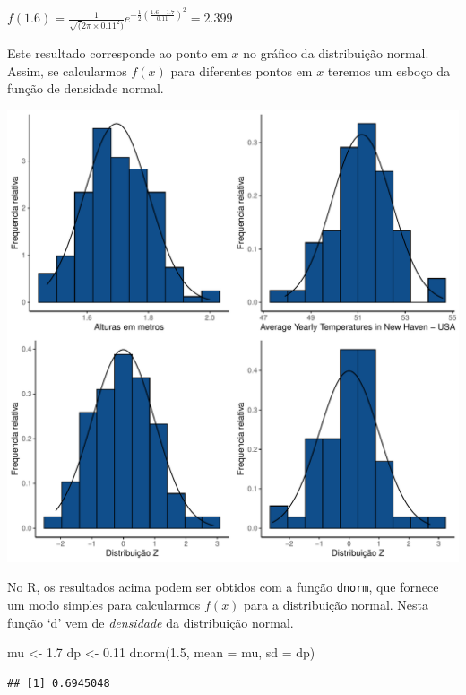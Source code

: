 \documentclass[
]{book}
\newenvironment{Shaded}{\begin{snugshade}}{\end{snugshade}}
\newcommand{\AttributeTok}[1]{\textcolor[rgb]{0.77,0.63,0.00}{#1}}
\newcommand{\FloatTok}[1]{\textcolor[rgb]{0.00,0.00,0.81}{#1}}
\newcommand{\FunctionTok}[1]{\textcolor[rgb]{0.00,0.00,0.00}{#1}}
\newcommand{\NormalTok}[1]{#1}
\newcommand{\OtherTok}[1]{\textcolor[rgb]{0.56,0.35,0.01}{#1}}
\begin{document}
\(f(1.6) = \frac{1}{\sqrt(2\pi \times0.11^2)}e^{-\frac{1}{2}(\frac{1.6 - 1.7}{0.11})^2} = 2.399\)

Este resultado corresponde ao ponto em \(x\) no gráfico da distribuição normal. Assim, se calcularmos \(f(x)\) para diferentes pontos em \(x\) teremos um esboço da função de densidade normal.

\begin{center}\includegraphics{probest-cambientais_files/figure-latex/unnamed-chunk-68-1} \end{center}

No R, os resultados acima podem ser obtidos com a função \texttt{dnorm}, que fornece um modo simples para calcularmos \(f(x)\) para a distribuição normal. Nesta função `d' vem de \emph{densidade} da distribuição normal.

\begin{Shaded}
\begin{Highlighting}[]
\NormalTok{mu }\OtherTok{\textless{}{-}} \FloatTok{1.7}
\NormalTok{dp }\OtherTok{\textless{}{-}} \FloatTok{0.11}
\FunctionTok{dnorm}\NormalTok{(}\FloatTok{1.5}\NormalTok{, }\AttributeTok{mean =}\NormalTok{ mu, }\AttributeTok{sd =}\NormalTok{ dp)}
\end{Highlighting}
\end{Shaded}

\begin{verbatim}
## [1] 0.6945048
\end{verbatim}
\end{document}
